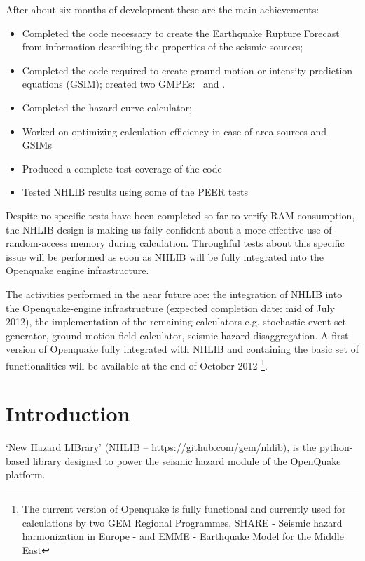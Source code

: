 \documentclass[11pt,a4paper,headings=small,dvips]{scrartcl}
\begin{document}
After about six months of development these are the main achievements:
\begin{itemize}
    \item Completed the code necessary to create the Earthquake Rupture
        Forecast from information describing the properties of the seismic
        sources;
    \item Completed the code required to create ground motion or intensity 
    prediction equations (GSIM); created two GMPEs: \citet{sadigh1997} and
    \citet{chiou2008}.
    \item Completed the hazard curve calculator;
    \item Worked on optimizing calculation efficiency in case of area sources 
        and GSIMs
    \item Produced a complete test coverage of the code
    \item Tested NHLIB results using some of the PEER tests \citep{thomas2010}
\end{itemize}
Despite no specific tests have been completed so far to verify RAM consumption,
the NHLIB design is making us faily confident about a more effective use of 
random-access memory during calculation. 
Throughful tests about this specific issue will be performed as soon as 
NHLIB will be fully integrated into the O\-pen\-quake engine infrastructure.

The activities performed in the near future are: the integration of NHLIB 
into the  O\-pen\-quake\--engine infrastructure (expected completion date:
mid of July 2012), the implementation of the remaining calculators e.g. 
stochastic event set generator, ground motion field calculator, seismic 
hazard disaggregation.
A first version of Openquake fully integrated with NHLIB and containing the
basic set of functionalities will be available at the end of October 2012
\footnote{The current version of Openquake is fully functional and currently 
used for calculations by two GEM Regional Programmes, SHARE - Seismic hazard 
harmonization in Europe - and EMME - Earthquake Model for the Middle East}.
\cleardoublepage
\tableofcontents

\clearpage
\section{Introduction}
\setcounter{figure}{0}
`New Hazard LIBrary' (NHLIB -- https://github.com/gem/nhlib), is the 
python-based library designed to power the seismic hazard module of the 
OpenQuake platform. 
\end{document}
